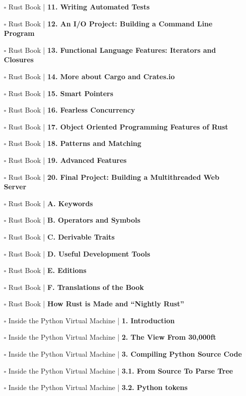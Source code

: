 \documentclass[a4, landscape, 12pt]{article}
\newcommand{\checkbox}{$\square$}%
\begin{document}
\begin{itemize}
{}
\item [\checkbox]  Rust Book  | \textbf{ 11. Writing Automated Tests
}
\item [\checkbox]  Rust Book  | \textbf{ 12. An I/O Project: Building a Command Line Program
}
\item [\checkbox]  Rust Book  | \textbf{ 13. Functional Language Features: Iterators and Closures
}
\item [\checkbox]  Rust Book  | \textbf{ 14. More about Cargo and Crates.io
}
\item [\checkbox]  Rust Book  | \textbf{ 15. Smart Pointers
}
\item [\checkbox]  Rust Book  | \textbf{ 16. Fearless Concurrency
}
\item [\checkbox]  Rust Book  | \textbf{ 17. Object Oriented Programming Features of Rust
}
\item [\checkbox]  Rust Book  | \textbf{ 18. Patterns and Matching
}
\item [\checkbox]  Rust Book  | \textbf{ 19. Advanced Features
}
\item [\checkbox]  Rust Book  | \textbf{ 20. Final Project: Building a Multithreaded Web Server
}
\item [\checkbox]  Rust Book  | \textbf{ A. Keywords
}
\item [\checkbox]  Rust Book  | \textbf{ B. Operators and Symbols
}
\item [\checkbox]  Rust Book  | \textbf{ C. Derivable Traits
}
\item [\checkbox]  Rust Book  | \textbf{ D. Useful Development Tools
}
\item [\checkbox]  Rust Book  | \textbf{ E. Editions
}
\item [\checkbox]  Rust Book  | \textbf{ F. Translations of the Book
}
\item [\checkbox]  Rust Book  | \textbf{ How Rust is Made and “Nightly Rust”
}
\item [\checkbox]  Inside the Python Virtual Machine  | \textbf{ 1. Introduction
}
\item [\checkbox]  Inside the Python Virtual Machine  | \textbf{ 2. The View From 30,000ft
}
\item [\checkbox]  Inside the Python Virtual Machine  | \textbf{ 3. Compiling Python Source Code
}
\item [\checkbox]  Inside the Python Virtual Machine  | \textbf{ 3.1. From Source To Parse Tree
}
\item [\checkbox]  Inside the Python Virtual Machine  | \textbf{ 3.2. Python tokens
}

\end{itemize}
\end{document}
